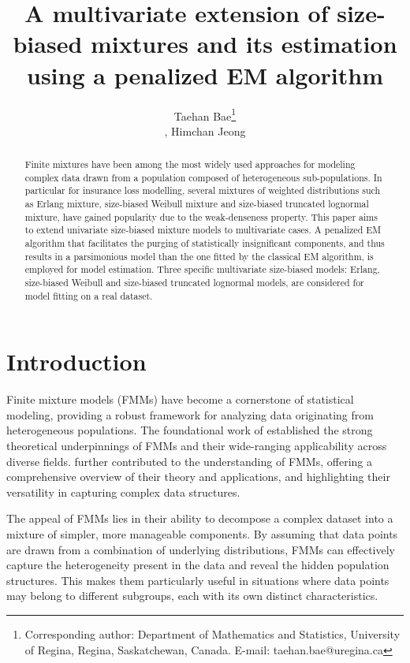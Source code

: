 \documentclass[eng]{csam}
\begin{document}
\title{A multivariate extension of size-biased mixtures and its estimation using a penalized EM algorithm}

\author{Taehan Bae\footnote{Corresponding author: Department of Mathematics and Statistics, University of Regina, Regina, Saskatchewan, Canada. E-mail: taehan.bae@uregina.ca}\address[a]{Department of Mathematics and Statistics, University of Regina;}, Himchan Jeong\address[b]{Department of Statistics and Actuarial Science, Simon Fraser University}}

\begin{abstract}
Finite mixtures have been among the most widely used approaches for modeling complex data drawn from a population composed of heterogeneous sub-populations. In particular for insurance loss modelling, several mixtures of weighted distributions such as Erlang mixture, size-biased Weibull mixture and size-biased truncated lognormal mixture, have gained popularity due to the weak-denseness property.
This paper aims to extend univariate size-biased mixture models to multivariate cases. A penalized EM algorithm that facilitates the purging of statistically insignificant components, and thus results in a parsimonious model than the one fitted by the classical EM algorithm, is employed for model estimation. Three specific multivariate size-biased models: Erlang, size-biased Weibull and size-biased truncated lognormal models, are considered for model fitting on a real dataset.
\end{abstract}


\section{Introduction}
Finite mixture models (FMMs) have become a cornerstone of statistical modeling, providing a robust framework for analyzing data originating from heterogeneous populations. The foundational work of \citet{Titterington1985} established the strong theoretical underpinnings of FMMs and their wide-ranging applicability across diverse fields. \citet{Lindsay1995} further contributed to the understanding of FMMs, offering a comprehensive overview of their theory and applications, and highlighting their versatility in capturing complex data structures.

The appeal of FMMs lies in their ability to decompose a complex dataset into a mixture of simpler, more manageable components. By assuming that data points are drawn from a combination of underlying distributions, FMMs can effectively capture the heterogeneity present in the data and reveal the hidden population structures. This makes them particularly useful in situations where data points may belong to different subgroups, each with its own distinct characteristics.
\end{document}
